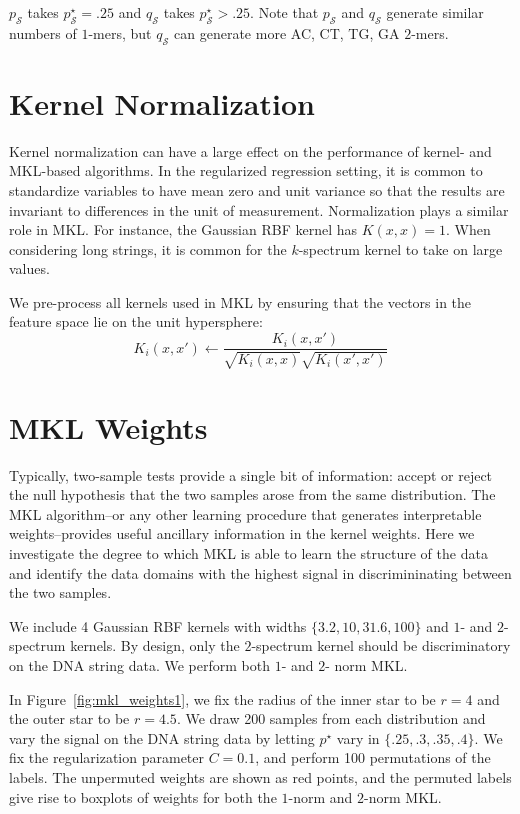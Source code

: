 $p_{\mathcal{S}}$ takes $p_{\mathcal{S}}^{\star} = .25$ and
$q_{\mathcal{S}}$ takes $p_{\mathcal{S}}^{\star} > .25$.  Note that
$p_{\mathcal{S}}$ and $q_{\mathcal{S}}$ generate similar numbers of
$1$-mers, but $q_{\mathcal{S}}$ can generate more AC, CT, TG, GA
$2$-mers.

\section{Kernel Normalization}
Kernel normalization can have a large effect on the performance of kernel- and MKL-based
algorithms.  In the regularized regression setting, it is common to standardize variables to have
mean zero and unit variance so that the results are invariant to differences in
the unit of measurement.  Normalization plays a similar role in MKL.  For instance,
the Gaussian RBF kernel has $K(x, x) = 1$.  When considering long strings, it is
common for the $k$-spectrum kernel to take on large values.

We pre-process all kernels used in MKL by ensuring that the vectors in the feature
space lie on the unit hypersphere:
\begin{equation*}
  K_i(x, x') \leftarrow \frac{K_i(x, x')}{\sqrt{K_i(x, x)}\sqrt{K_i(x', x')}}
\end{equation*}

\section{MKL Weights}
Typically, two-sample tests provide a single bit of information: accept or reject the null hypothesis
that the two samples arose from the same distribution.
The MKL algorithm--or any other learning procedure that generates interpretable
weights--provides useful ancillary information in the kernel weights.  Here we
investigate the degree to which MKL is able to learn the structure of the data
and identify the data domains with the highest signal in discrimininating between
the two samples.

We include 4 Gaussian RBF kernels with widths $\{3.2, 10, 31.6, 100\}$ and $1$- and
$2$-spectrum kernels.  By design, only the $2$-spectrum kernel should be discriminatory
on the DNA string data.  We perform both $1$- and $2$- norm MKL.

In Figure~\ref{fig:mkl_weights1}, we fix the radius of the inner star to be $r = 4$
and the outer star to be $r = 4.5$.  We draw 200 samples from each distribution and
vary the signal on the DNA string data by letting $p^{\star}$ vary in $\{.25, .3, .35, .4\}$.
We fix the regularization parameter $C = 0.1$, and perform 100 permutations of the labels.
The unpermuted weights are shown as red points, and the permuted labels give rise to
boxplots of weights for both the $1$-norm and $2$-norm MKL.

